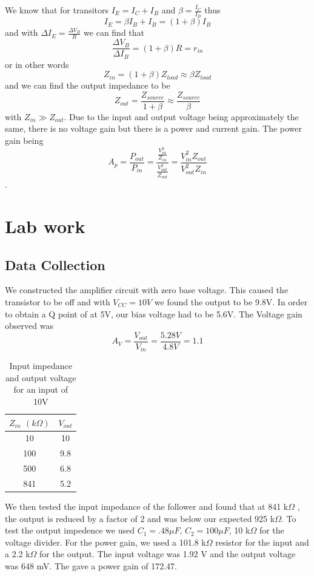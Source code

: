 \documentclass[11pt,letterpaper,onecolumn]{article}
\begin{document}
We know that for transitors $I_E = I_C + I_B$ and $\beta = \frac{I_C}{I_B}$
thus 
$$I_E = \beta I_B + I_B = \left( 1 + \beta \right) I_B$$
and with $\Delta I_E = \frac{\Delta V_B}{R}$ we can find that
$$\frac{\Delta V_B}{\Delta I_B}= \left( 1 + \beta \right) R = r_{in}$$
or in other words
$$Z_{in} = \left( 1 + \beta \right) Z_{load} \approx \beta Z_{load}$$
and we can find the output impedance to be 
$$Z_{out} = \frac{Z_{source}}{1 + \beta} \approx \frac{Z_{source}}{\beta} $$
with $Z_{in} \gg Z_{out}$. Due to the input and output voltage being approximately the same, there is no voltage gain but there is a power and current gain. The power gain being
$$A_p = \frac{P_{out}}{P_{in}}=\frac{\frac{V_{in}^2}{Z_{in}}}{\frac{V_{out}^2}{Z_{out}}}=\frac{V_{in}^2 Z_{out}}{V_{out}^2 Z_{in}}$$.

\section{Lab work}

\subsection{Data Collection}

We constructed the amplifier circuit with zero base voltage. This caused the transistor to be off and with $V_{CC}= 10V$ we found the output to be 9.8V. In order to obtain a Q point of at 5V, our bias voltage had to be 5.6V. The Voltage gain observed was
$$A_V = \frac{V_{out}}{V_{in}}=\frac{5.28V}{4.8V}=1.1$$

\begin{table}[]
    \centering
    \begin{tabular}{|c|c|}
    \hline
    $Z_{in}$ $\left(k\Omega \right)$ & $V_{out}$  \\ \hline
    10 & 10 \\
    100 & 9.8 \\
    500 & 6.8 \\
    841 & 5.2 \\
    \hline
    \end{tabular}
    \caption{Input impedance and output voltage for an input of 10V}
    \label{tab:my_label}
\end{table}

We then tested the input impedance of the follower and found that at 841 k$\Omega$ , the output is reduced by a factor of 2 and was below our expected 925 k$\Omega$. To test the output impedence we used $C_1 = .48\mu F$, $C_2 = 100\mu F$, 10 k$\Omega$ for the voltage divider. For the power gain, we used a 101.8 k$\Omega$ resistor for the input and a 2.2 k$\Omega$ for the output. The input voltage was 1.92 V and the output voltage was 648 mV. The gave a power gain of 172.47.
\end{document}
